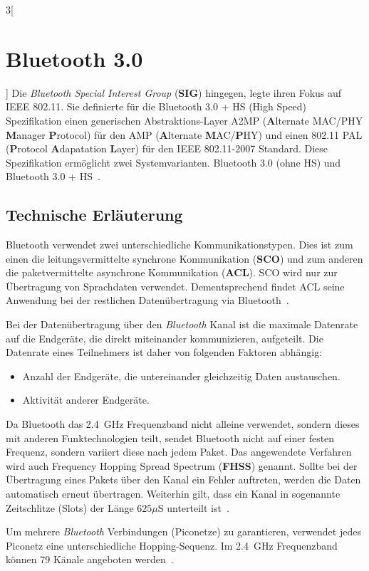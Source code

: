 \begin{multicols}{3}[\section{Bluetooth 3.0}]
Die \textit{Bluetooth Special Interest Group} (\textbf{SIG}) hingegen, legte ihren Fokus auf IEEE 802.11. Sie definierte für die Bluetooth 3.0 + HS (High Speed) Spezifikation einen generischen Abstraktions-Layer A2MP (\textbf{A}lternate MAC/PHY \textbf{M}anager \textbf{P}rotocol) für den AMP (\textbf{A}lternate \textbf{M}AC/\textbf{P}HY) und einen 802.11 PAL (\textbf{P}rotocol \textbf{A}dapatation \textbf{L}ayer) für den IEEE 802.11-2007 Standard. Diese Spezifikation ermöglicht zwei Systemvarianten. Bluetooth 3.0 (ohne HS) und Bluetooth 3.0 + HS~\cite{bluetooth3.0.2}.

\subsection*{Technische Erläuterung}
Bluetooth verwendet zwei unterschiedliche Kommunikationstypen. Dies ist zum einen die leitungsvermittelte synchrone Kommunikation (\textbf{SCO}) und zum anderen die paketvermittelte asynchrone Kommunikation (\textbf{ACL}). SCO wird nur zur Übertragung von Sprachdaten verwendet. Dementsprechend findet ACL seine Anwendung bei der restlichen Datenübertragung via Bluetooth~\cite{bluetooth3.0.4}.

Bei der Datenübertragung über den \textit{Bluetooth} Kanal ist die maximale Datenrate auf die Endgeräte, die direkt miteinander kommunizieren, aufgeteilt. Die Datenrate eines Teilnehmers ist daher von folgenden Faktoren abhängig:
\begin{itemize}
	\item Anzahl der Endgeräte, die untereinander gleichzeitig Daten austauschen.
	\item Aktivität anderer Endgeräte.
\end{itemize}
Da Bluetooth das \SI{2,4}{\giga\hertz} Frequenzband nicht alleine verwendet, sondern dieses mit anderen Funktechnologien teilt, sendet Bluetooth nicht auf einer festen Frequenz, sondern variiert diese nach jedem Paket. Das angewendete Verfahren wird auch Frequency Hopping Spread Spectrum (\textbf{FHSS}) genannt. Sollte bei der Übertragung eines Pakets über den Kanal ein Fehler auftreten, werden die Daten automatisch erneut übertragen. Weiterhin gilt, dass ein Kanal in sogenannte Zeitschlitze (Slots) der Länge $625\mu$S unterteilt ist~\cite{bluetooth3.0.1}.

Um mehrere \textit{Bluetooth} Verbindungen (Piconetze) zu garantieren, verwendet jedes Piconetz eine unterschiedliche Hopping-Sequenz. Im \SI{2,4}{\giga\hertz} Frequenzband können 79 Känale angeboten werden~\cite{bluetooth3.0.3}.


\end{multicols}
